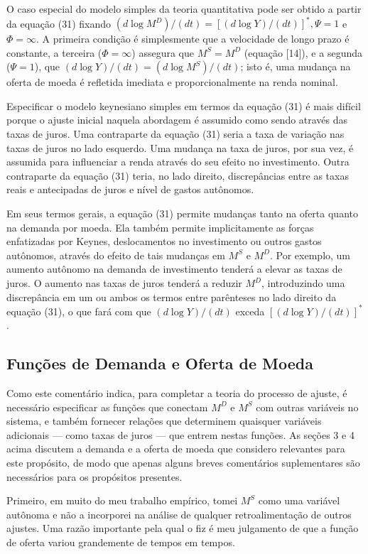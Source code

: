 \documentclass[12pt]{article}
\begin{document}
O caso especial do modelo simples da teoria quantitativa pode ser obtido a partir da equação (31) fixando $(d \log M^D)/(dt) = [(d \log Y)/(dt)]^*, \Psi = 1$ e $\Phi = \infty$. A primeira condição é simplesmente que a velocidade de longo prazo é constante, a terceira ($\Phi = \infty$) assegura que $M^S = M^D$ (equação [14]), e a segunda ($\Psi = 1$), que $(d \log Y)/(dt) = (d \log M^S)/(dt)$; isto é, uma mudança na oferta de moeda é refletida imediata e proporcionalmente na renda nominal.

Especificar o modelo keynesiano simples em termos da equação (31) é mais difícil porque o ajuste inicial naquela abordagem é assumido como sendo através das taxas de juros. Uma contraparte da equação (31) seria a taxa de variação nas taxas de juros no lado esquerdo. Uma mudança na taxa de juros, por sua vez, é assumida para influenciar a renda através do seu efeito no investimento. Outra contraparte da equação (31) teria, no lado direito, discrepâncias entre as taxas reais e antecipadas de juros e nível de gastos autônomos.

Em seus termos gerais, a equação (31) permite mudanças tanto na oferta quanto na demanda por moeda. Ela também permite implicitamente as forças enfatizadas por Keynes, deslocamentos no investimento ou outros gastos autônomos, através do efeito de tais mudanças em $M^S$ e $M^D$. Por exemplo, um aumento autônomo na demanda de investimento tenderá a elevar as taxas de juros. O aumento nas taxas de juros tenderá a reduzir $M^D$, introduzindo uma discrepância em um ou ambos os termos entre parênteses no lado direito da equação (31), o que fará com que $(d \log Y)/(dt)$ exceda $[(d \log Y)/(dt)]^*$.

\subsection{Funções de Demanda e Oferta de Moeda}

Como este comentário indica, para completar a teoria do processo de ajuste, é necessário especificar as funções que conectam $M^D$ e $M^S$ com outras variáveis no sistema, e também fornecer relações que determinem quaisquer variáveis adicionais — como taxas de juros — que entrem nestas funções. As seções 3 e 4 acima discutem a demanda e a oferta de moeda que considero relevantes para este propósito, de modo que apenas alguns breves comentários suplementares são necessários para os propósitos presentes.

Primeiro, em muito do meu trabalho empírico, tomei $M^S$ como uma variável autônoma e não a incorporei na análise de qualquer retroalimentação de outros ajustes. Uma razão importante pela qual o fiz é meu julgamento de que a função de oferta variou grandemente de tempos em tempos.
\end{document}
